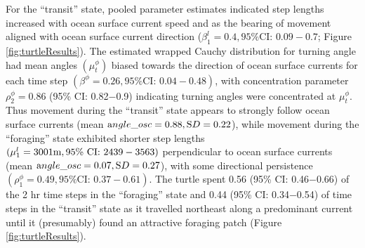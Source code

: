 \documentclass[12pt]{article}\usepackage[]{graphicx}\usepackage[]{xcolor}
\begin{document}
For the ``transit'' state, pooled parameter estimates indicated step lengths increased with ocean surface current speed and as the bearing of movement aligned with ocean surface current direction ($\beta^l_1=0.4, \text{95\% CI: } 0.09-0.7$; Figure \ref{fig:turtleResults}). The estimated wrapped Cauchy distribution for turning angle had mean angles $(\mu^\phi_t)$ biased towards the direction of ocean surface currents for each time step $(\beta^\phi=0.26, \text{95\% CI: } 0.04-0.48)$, with concentration parameter $\rho^\phi_2=0.86$ (95\% CI: 0.82$-$0.9) indicating turning angles were concentrated at $\mu^\phi_t$. Thus movement during the ``transit'' state appears to strongly follow ocean surface currents (mean ${\text angle\_osc}=0.88,{\text SD}=0.22$), while movement during the ``foraging'' state exhibited shorter step lengths $(\mu^l_1=3001{\text m}, \text{95\% CI: } 2439-3563)$ perpendicular to ocean surface currents (mean ${\text angle\_osc}=0.07,{\text SD}=0.27$), with some directional persistence $(\rho^\phi_1=0.49, \text{95\% CI: } 0.37-0.61)$. The turtle spent 0.56 (95\% CI: 0.46$-$0.66) of the 2 hr time steps in the ``foraging'' state and 0.44 (95\% CI: 0.34$-$0.54) of time steps in the ``transit'' state as it travelled northeast along a predominant current until it (presumably) found an attractive foraging patch (Figure \ref{fig:turtleResults}).
\end{document}
